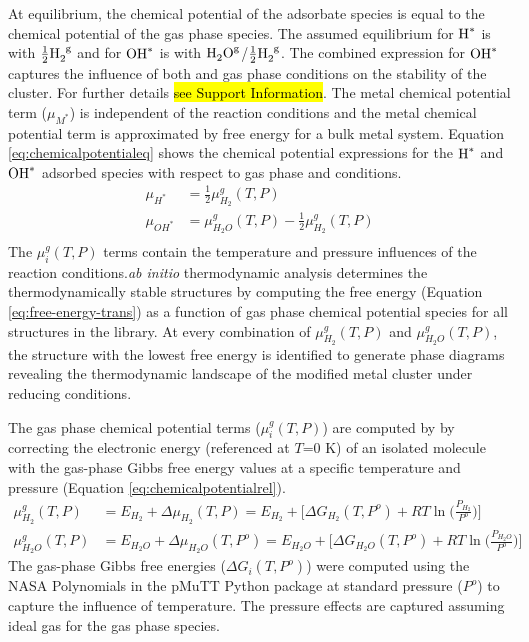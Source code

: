 \documentclass[journal=jctcce,manuscript=article]{achemso}
\begin{document}
At equilibrium, the chemical potential of the adsorbate species is equal to the chemical potential of the gas phase species. The assumed equilibrium for $\ce{H^{*}}$ is with $\frac{1}{2}\ce{H_{2}^{g}}$ and for $\ce{OH^{*}}$ is with $\ce{H_{2}O^{g}}$/$\frac{1}{2}\ce{H_{2}^{g}}$. The combined expression for $\ce{OH^{*}}$ captures the influence of both  and  gas phase conditions on the stability of the cluster. For further details \hl{see Support Information}. The metal chemical potential term ($\mu_{M^{*}}$) is independent of the reaction conditions and the metal chemical potential term is approximated by free energy for a bulk metal system. Equation \ref{eq:chemicalpotentialeq} shows the chemical potential expressions for the $\ce{H^{*}}$ and $\ce{OH^{*}}$ adsorbed species with respect to gas phase  and  conditions. 
\begin{equation}
    \begin{split}
        \mu_{H^{*}} &= \frac{1}{2} \mu_{H_{2}}^{g}(T,P) \\ 
        \mu_{OH^{*}} &= \mu_{H_{2}O}^{g}(T,P) - \frac{1}{2} \mu_{H_{2}}^{g}(T,P) \\
    \end{split}
    \label{eq:chemicalpotentialeq}
\end{equation}
The $\mu_{i}^{g}(T,P)$ terms contain the temperature and pressure influences of the reaction conditions.\textit{ab initio} thermodynamic analysis determines the thermodynamically stable structures by computing the free energy (Equation \ref{eq:free-energy-trans}) as a function of gas phase chemical potential species for all structures in the library. At every combination of $\mu_{H_{2}}^{g}(T,P)$ and $\mu_{H_{2}O}^{g}(T,P)$, the structure with the lowest free energy is identified to generate phase diagrams revealing the thermodynamic landscape of the modified metal cluster under reducing conditions. 

The gas phase chemical potential terms ($\mu_{i}^{g}(T,P)$) are computed by by correcting the electronic energy (referenced at $T$=0 K) of an isolated molecule with the gas-phase Gibbs free energy values at a specific temperature and pressure (Equation \ref{eq:chemicalpotentialrel}).
\begin{equation}
    \begin{split}
        \mu_{H_{2}}^{g}(T,P) &= E_{H_2} + \Delta \mu_{H_{2}}(T,P)  = E_{H_{2}} + \Big[ \Delta G_{H_{2}}(T,P^{o}) + RT \ln{\Big( \frac{P_{H_{2}}}{P^{o}} \Big)} \Big] \\  
        \mu_{H_{2}O}^{g}(T,P) &= E_{H_{2}O} + \Delta \mu_{H_{2}O}(T,P^{o}) =  E_{H_{2}O} + \Big[ \Delta G_{H_{2}O}(T,P^{o}) + RT \ln{\Big( \frac{P_{H_{2}O}}{P^{o}} \Big)} \Big]
    \end{split}
    \label{eq:chemicalpotentialrel}
\end{equation}
 The gas-phase Gibbs free energies ($\Delta G_{i}(T,P^{o})$) were computed using the NASA Polynomials\cite{Mcbride1993} in the pMuTT\cite{LYM2019106864} Python package at standard pressure ($P^{o}$) to capture the influence of temperature. The pressure effects are captured assuming ideal gas for the gas phase species. 
 
\end{document}
